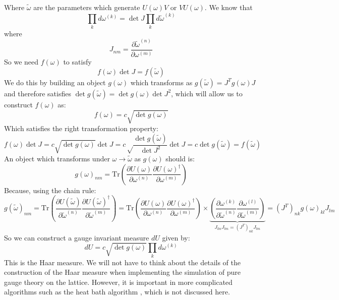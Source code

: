 \documentclass[11pt]{article}
\begin{document}
Where $\tilde\omega$ are the parameters which generate $U(\omega)V$ or $VU(\omega)$. We know that
\begin{equation}\prod_k d\omega^{(k)}=\det J\prod_k d\tilde \omega^{(k)}\end{equation}
where
\begin{equation}J_{nm}=\frac{\partial\tilde\omega^{(n)}}{\partial\omega^{(m)}}\end{equation}
So we need $f(\omega)$ to satisfy
\begin{equation}f(\omega)\det J=f(\tilde\omega)\end{equation}
We do this by building an object $g(\omega)$ which transforms as $g(\tilde\omega)=J^Tg(\omega)J$ and therefore satisfies $\det g(\tilde\omega)=\det g(\omega)\det J^2$, which will allow us to construct $f(\omega)$ as:
\begin{equation}f(\omega)=c\sqrt{\det g(\omega)}\end{equation}
Which satisfies the right transformation property:
\begin{equation}f(\omega)\det J=c\sqrt{\det g(\omega)}\det J=c\sqrt\frac{\det g(\tilde\omega)}{\det J^2}\det J=c\det g(\tilde\omega)=f(\tilde\omega)\end{equation}
An object which transforms under $\omega\to\tilde\omega$ as $g(\omega)$ should is:
\begin{equation}g(\omega)_{nm}=\mathrm{Tr}\left(\frac{\partial U(\omega)}{\partial \omega^{(n)}}\frac{\partial U(\omega)^\dagger}{\partial \omega^{(m)}}\right)\end{equation}
Because, using the chain rule: 
\begin{equation}g(\tilde\omega)_{nm}=\mathrm{Tr}\left(\frac{\partial U(\tilde \omega)}{\partial \tilde \omega^{(n)}}\frac{\partial U(\tilde \omega)^\dagger}{\partial \tilde \omega^{(m)}}\right)=\mathrm{Tr}\left(\frac{\partial U(\omega)}{\partial \omega^{(n)}}\frac{\partial U(\omega)^\dagger}{\partial \omega^{(m)}}\right)\times\underbrace{\left(\frac{\partial \omega^{(k)}}{\partial\tilde\omega^{(n)}}\frac{\partial \omega^{(l)}}{\partial\tilde\omega^{(m)}}\right)}_{J_{kn}J_{lm}=(J^T)_{nk}J_{lm}}=(J^T)_{nk}g(\omega)_{kl}J_{lm}\end{equation}
So we can construct a gauge invariant measure $dU$ given by:
\begin{equation}\label{eq:harr}dU=c\sqrt{\det g(\omega)}\prod_k d\omega^{(k)}\end{equation}
This is the Haar measure. We will not have to think about the details of the construction of the Haar measure when implementing the simulation of pure gauge theory on the lattice. However, it is important in more complicated algorithms such as the heat bath algorithm \cite{gattringer_lang_2009}, which is not discussed here.
\end{document}

